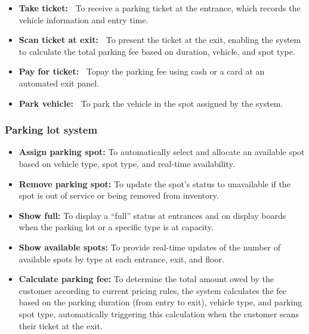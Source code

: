 \begin{itemize}
\item
\protect{}\label{mgB-AH-ct0_C19bZDUfHc}
\textbf{Take ticket:~} To receive a parking ticket at the entrance, which records the vehicle information and entry time.
\item
\protect{}\label{HiDqJwBBs3ulJVl_5OrfF}
\textbf{Scan ticket at exit:~} To present the ticket at the exit, enabling the system to calculate the total parking fee based on duration, vehicle, and spot type.
\item
\protect{}\label{XAX5iCFzFHaT-MmkA2YtH}
\textbf{Pay for ticket:~} Topay the parking fee using cash or a card at an automated exit panel.
\item
\protect{}\label{hhX4IvR0kl9XIXUnG1bL2}
\textbf{Park vehicle:~} To park the vehicle in the spot assigned by the system.
\end{itemize}

\subsubsection{Parking lot system}\label{OaBC8fel07Zkkyo76LMSS}

\begin{itemize}
\item
\protect{}\label{Ug9k_78xnbkeSeY3JwyMj}
\textbf{Assign parking spot:} To automatically select and allocate an available spot based on vehicle type, spot type, and real-time availability.
\item
\protect{}\label{lnWykX12vKGRGMjKxoFT9}
\textbf{Remove parking spot:} To update the spot's status to unavailable if the spot is out of service or being removed from inventory.
\item
\protect{}\label{Evbih2xjn3fVrh_wc3s2A}
\textbf{Show full:} To display a ``full'' status at entrances and on display boards when the parking lot or a specific type is at capacity.
\item
\protect{}\label{suW32qfClW0MllkxdfhnU}
\textbf{Show available spots:} To provide real-time updates of the number of available spots by type at each entrance, exit, and floor.
\item
\protect{}\label{cIXe-fWQHwRdGu2937EdC}
\textbf{Calculate parking fee:} To determine the total amount owed by the customer according to current pricing rules, the system calculates the fee based on the parking duration (from entry to exit), vehicle type, and parking spot type, automatically triggering this calculation when the customer scans their ticket at the exit.
\end{itemize}

